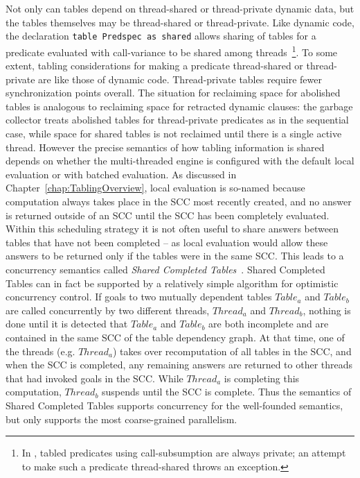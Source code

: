 Not only can tables depend on thread-shared or thread-private dynamic
data, but 
the tables themselves may be thread-shared or thread-private.  Like
dynamic code, the declaration {\tt table Predspec as shared} allows
sharing of tables for a predicate evaluated with call-variance to be
shared among threads~\footnote{In \version, tabled predicates using
  call-subsumption are always private; an attempt to make such a
  predicate thread-shared throws an exception.}.
%
To some extent, tabling considerations for making a predicate
thread-shared or thread-private are like those of dynamic code.
Thread-private tables require fewer synchronization points overall.
The situation for reclaiming space for abolished tables is analogous
to reclaiming space for retracted dynamic clauses: the garbage
collector treats abolished tables for thread-private predicates as in
the sequential case, while space for shared tables is not reclaimed
until there is a single active thread.  However the precise semantics
of how tabling information is shared depends on whether the
multi-threaded engine is configured with the default local evaluation
or with batched evaluation.  As discussed in
Chapter~\ref{chap:TablingOverview}, local evaluation is so-named
because computation always takes place in the SCC most recently
created, and no answer is returned outside of an SCC until the SCC has
been completely evaluated.  Within this scheduling strategy it is not
often useful to share answers between tables that have not been
completed -- as local evaluation would allow these answers to be
returned only if the tables were in the same SCC.  This leads to a
concurrency semantics called {\em Shared Completed
  Tables}~\cite{Marques07,MarS08,MarS10}.  Shared Completed Tables can
in fact be supported by a relatively simple algorithm for optimistic
concurrency control.  If goals to two mutually dependent tables
$Table_a$ and $Table_b$ are called concurrently by two different
threads, $Thread_a$ and $Thread_b$, nothing is done until it is
detected that $Table_a$ and $Table_b$ are both incomplete and are
contained in the same SCC of the table dependency graph.  At that
time, one of the threads (e.g. $Thread_a$) takes over recomputation of
all tables in the SCC, and when the SCC is completed, any remaining
answers are returned to other threads that had invoked goals in the
SCC.  While $Thread_a$ is completing this computation, $Thread_b$
suspends until the SCC is complete.  Thus the semantics of Shared
Completed Tables supports concurrency for the well-founded semantics,
but only supports the most coarse-grained parallelism.

